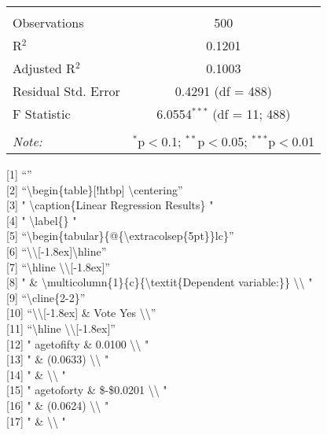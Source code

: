\documentclass[10pt,]{article}
\begin{document}
\begin{table}[!htbp]
\begin{tabular}{@{\extracolsep{5pt}}lc}
\hline \\[-1.8ex] 
Observations & 500 \\ 
R$^{2}$ & 0.1201 \\ 
Adjusted R$^{2}$ & 0.1003 \\ 
Residual Std. Error & 0.4291 (df = 488) \\ 
F Statistic & 6.0554$^{***}$ (df = 11; 488) \\ 
\hline 
\hline \\[-1.8ex] 
\textit{Note:}  & \multicolumn{1}{r}{$^{*}$p$<$0.1; $^{**}$p$<$0.05; $^{***}$p$<$0.01} \\ 
\end{tabular} 
\end{table}

{[}1{]} ``''\\
{[}2{]} ``\textbackslash{}begin\{table\}{[}!htbp{]}
\textbackslash{}centering''\\
{[}3{]} " \textbackslash{}caption\{Linear Regression Results\} "\\
{[}4{]} " \textbackslash{}label\{\} "\\
{[}5{]}
``\textbackslash{}begin\{tabular\}\{@\{\textbackslash{}extracolsep\{5pt\}\}lc\}''\\
{[}6{]}
``\textbackslash{}\textbackslash{}{[}-1.8ex{]}\textbackslash{}hline''\\
{[}7{]} ``\textbackslash{}hline
\textbackslash{}\textbackslash{}{[}-1.8ex{]}''\\
{[}8{]} " \&
\textbackslash{}multicolumn\{1\}\{c\}\{\textbackslash{}textit\{Dependent
variable:\}\} \textbackslash{}\textbackslash{} "\\
{[}9{]} ``\textbackslash{}cline\{2-2\}''\\
{[}10{]} ``\textbackslash{}\textbackslash{}{[}-1.8ex{]} \& Vote Yes
\textbackslash{}\textbackslash{}''\\
{[}11{]} ``\textbackslash{}hline
\textbackslash{}\textbackslash{}{[}-1.8ex{]}''\\
{[}12{]} " agetofifty \& 0.0100 \textbackslash{}\textbackslash{} "\\
{[}13{]} " \& (0.0633) \textbackslash{}\textbackslash{} "\\
{[}14{]} " \& \textbackslash{}\textbackslash{} "\\
{[}15{]} " agetoforty \& \$-\$0.0201 \textbackslash{}\textbackslash{}
"\\
{[}16{]} " \& (0.0624) \textbackslash{}\textbackslash{} "\\
{[}17{]} " \& \textbackslash{}\textbackslash{} "\\
\end{document}
